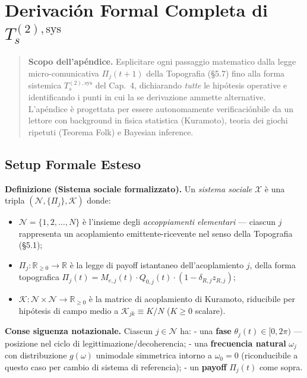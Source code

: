 \chapter{\texorpdfstring{Derivación Formal Completa di
\(T_s^{(2),\text{sys}}\)}{Derivación Formal Completa di T\_s\^{}\{(2),\textbackslash text\{sys\}\}}}\label{se derivazione-formal-completa-di-t_s2textsys}

\begin{quote}
\textbf{Scopo dell'apéndice.} Esplicitare ogni passaggio matematico
dalla legge micro-comunicativa \(\Pi_j(t+1)\) della Topografia (\S{}5.7)
fino alla forma sistemica \(T_s^{(2),\text{sys}}\) del Cap.~4,
dichiarando \emph{tutte} le hipótesis operative e identificando i punti in
cui la se derivazione ammette alternative. L'apéndice è progettata per
essere autonomamente verificaciónbile da un lettore con background in fisica
statistica (Kuramoto), teoria dei giochi ripetuti (Teorema Folk) e
Bayesian inference.
\end{quote}



\section{Setup Formale Esteso}\label{setup-formal-esteso}

\Hypoth{} \textbf{Definizione (Sistema sociale formalizzato).} Un
\emph{sistema sociale} \(\mathcal{X}\) è una tripla
\((\mathcal{N}, \{\Pi_j\}, \mathcal{K})\) donde:

\begin{itemize}
\tightlist
\item
  \(\mathcal{N} = \{1, 2, \ldots, N\}\) è l'insieme degli
  \emph{accoppiamenti elementari} --- ciascun \(j\) rappresenta un
  acoplamiento emittente-ricevente nel senso della Topografia (\S{}5.1);
\item
  \(\Pi_j : \mathbb{R}_{\geq 0} \to \mathbb{R}\) è la legge di payoff
  istantaneo dell'acoplamiento \(j\), della forma topografica
  \(\Pi_j(t) = M_{e,j}(t) \cdot Q_{0,j}(t) \cdot (1 - \delta_{R,j} z_{R,j})\);
\item
  \(\mathcal{K} : \mathcal{N} \times \mathcal{N} \to \mathbb{R}_{\geq 0}\)
  è la matrice di acoplamiento di Kuramoto, riducibile per hipótesis di
  campo medio a \(\mathcal{K}_{jk} \equiv K/N\) (\(K \geq 0\) scalare).
\end{itemize}

\Proved{} \textbf{Conse siguenza notazionale.} Ciascun
\(j \in \mathcal{N}\) ha: - una \textbf{fase}
\(\theta_j(t) \in [0, 2\pi)\) --- posizione nel ciclo di
legittimazione/decoherencia; - una \textbf{frecuencia natural}
\(\omega_j\) con distribuzione \(g(\omega)\) unimodale simmetrica
intorno a \(\omega_0 = 0\) (riconducibile a questo caso per cambio di
sistema di referencia); - un \textbf{payoff} \(\Pi_j(t)\) come sopra.




